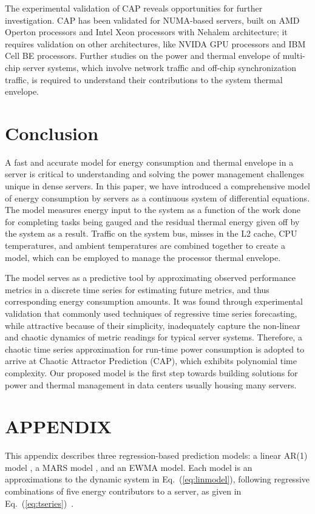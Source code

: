 \documentclass[acmtaco]{acmtrans2m}
\newcommand{\equationname}{Eq.}
\begin{document}
The experimental validation of CAP reveals opportunities for further
investigation.  CAP has been validated for NUMA-based servers, built on
AMD Operton processors and Intel Xeon processors with Nehalem
architecture; it requires validation on other architectures, like NVIDA
GPU processors and IBM Cell BE processors.  Further studies on the power
and thermal envelope of multi-chip server systems, which involve network
traffic and off-chip synchronization traffic, is required to understand
their contributions to the system thermal envelope.
\section{Conclusion}
\label{sec:conclusions}
A fast and accurate model for energy consumption and thermal envelope in
a server is critical to understanding and solving the power management
challenges unique in dense servers.  In this paper, we have introduced a
comprehensive model of energy consumption by servers as a continuous
system of differential equations.  The model measures energy input to
the system as a function of the work done for completing tasks being
gauged and the residual thermal energy given off by the system as a
result.  Traffic on the system bus, misses in the L2 cache, CPU
temperatures, and ambient temperatures are combined together to create a
model, which can be employed to manage the processor thermal envelope.

The model serves as a predictive tool by approximating observed
performance metrics in a discrete time series for estimating future
metrics, and thus corresponding energy consumption amounts.  It was
found through experimental validation that commonly used techniques of
regressive time series forecasting, while attractive because of their
simplicity, inadequately capture the non-linear and chaotic dynamics of
metric readings for typical server systems.  Therefore, a chaotic time
series approximation for run-time power consumption is adopted to arrive
at Chaotic Attractor Prediction (CAP), which exhibits polynomial time
complexity.  Our proposed model is the first step towards building
solutions for power and thermal management in data centers usually
housing many servers.
\appendix
\section*{APPENDIX}
\setcounter{section}{1} 
This appendix describes three regression-based prediction models: a linear
AR(1) model \cite{Box1994}, a MARS model \cite{Friedman1991}, and an
EWMA model. 
Each model is an  approximations to the dynamic system in
\equationname~(\ref{eq:linmodel}), following regressive combinations of
five energy contributors to a server, as given in 
\equationname~(\ref{eq:tseries})~\cite{Lewis2008}.
\end{document}
